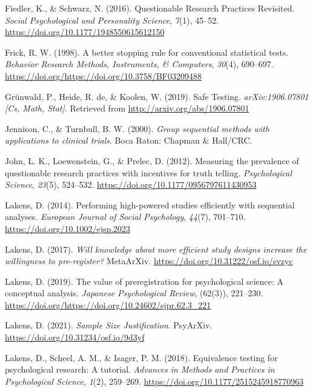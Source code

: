 \documentclass[
  english,
  ,jou, a4paper,floatsintext]{apa6}
\newlength{\cslhangindent}
\newenvironment{cslreferences}%
  {\setlength{\parindent}{0pt}%
  \everypar{\setlength{\hangindent}{\cslhangindent}}\ignorespaces}%
  {\par}
\begin{document}
\begin{cslreferences}
\leavevmode\hypertarget{ref-fiedler_questionable_2016}{}%
Fiedler, K., \& Schwarz, N. (2016). Questionable Research Practices Revisited. \emph{Social Psychological and Personality Science}, \emph{7}(1), 45--52. \url{https://doi.org/10.1177/1948550615612150}

\leavevmode\hypertarget{ref-frick_better_1998}{}%
Frick, R. W. (1998). A better stopping rule for conventional statistical tests. \emph{Behavior Research Methods, Instruments, \& Computers}, \emph{30}(4), 690--697. \url{https://doi.org/https://doi.org/10.3758/BF03209488}

\leavevmode\hypertarget{ref-grunwald_safe_2019}{}%
Grünwald, P., Heide, R. de, \& Koolen, W. (2019). Safe Testing. \emph{arXiv:1906.07801 {[}Cs, Math, Stat{]}}. Retrieved from \url{http://arxiv.org/abs/1906.07801}

\leavevmode\hypertarget{ref-jennison_group_2000}{}%
Jennison, C., \& Turnbull, B. W. (2000). \emph{Group sequential methods with applications to clinical trials}. Boca Raton: Chapman \& Hall/CRC.

\leavevmode\hypertarget{ref-john_measuring_2012}{}%
John, L. K., Loewenstein, G., \& Prelec, D. (2012). Measuring the prevalence of questionable research practices with incentives for truth telling. \emph{Psychological Science}, \emph{23}(5), 524--532. \url{https://doi.org/10.1177/0956797611430953}

\leavevmode\hypertarget{ref-lakens_performing_2014}{}%
Lakens, D. (2014). Performing high-powered studies efficiently with sequential analyses. \emph{European Journal of Social Psychology}, \emph{44}(7), 701--710. \url{https://doi.org/10.1002/ejsp.2023}

\leavevmode\hypertarget{ref-lakens_will_2017}{}%
Lakens, D. (2017). \emph{Will knowledge about more efficient study designs increase the willingness to pre-register?} MetaArXiv. \url{https://doi.org/10.31222/osf.io/svzyc}

\leavevmode\hypertarget{ref-lakens_value_2019}{}%
Lakens, D. (2019). The value of preregistration for psychological science: A conceptual analysis. \emph{Japanese Psychological Review}, (62(3)), 221--230. \url{https://doi.org/https://doi.org/10.24602/sjpr.62.3_221}

\leavevmode\hypertarget{ref-lakens_sample_2021}{}%
Lakens, D. (2021). \emph{Sample Size Justification}. PsyArXiv. \url{https://doi.org/10.31234/osf.io/9d3yf}

\leavevmode\hypertarget{ref-lakens_equivalence_2018}{}%
Lakens, D., Scheel, A. M., \& Isager, P. M. (2018). Equivalence testing for psychological research: A tutorial. \emph{Advances in Methods and Practices in Psychological Science}, \emph{1}(2), 259--269. \url{https://doi.org/10.1177/2515245918770963}


\end{cslreferences}
\end{document}
